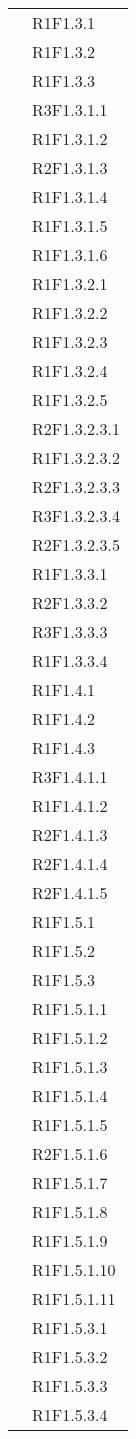 \begin{longtable}{|>{\centering}m{5cm}|m{5cm}<{\centering}|}
&{R1F1.3.1}\\
&{R1F1.3.2}\\
&{R1F1.3.3}\\
&{R3F1.3.1.1}\\
&{R1F1.3.1.2}\\
&{R2F1.3.1.3}\\
&{R1F1.3.1.4}\\
&{R1F1.3.1.5}\\
&{R1F1.3.1.6}\\
&{R1F1.3.2.1}\\
&{R1F1.3.2.2}\\
&{R1F1.3.2.3}\\
&{R1F1.3.2.4}\\
&{R1F1.3.2.5}\\
&{R2F1.3.2.3.1}\\
&{R1F1.3.2.3.2}\\
&{R2F1.3.2.3.3}\\
&{R3F1.3.2.3.4}\\
&{R2F1.3.2.3.5}\\
&{R1F1.3.3.1}\\
&{R2F1.3.3.2}\\
&{R3F1.3.3.3}\\
&{R1F1.3.3.4}\\

&{R1F1.4.1}\\
&{R1F1.4.2}\\
&{R1F1.4.3}\\
&{R3F1.4.1.1}\\
&{R1F1.4.1.2}\\
&{R2F1.4.1.3}\\
&{R2F1.4.1.4}\\
&{R2F1.4.1.5}\\

&{R1F1.5.1}\\
&{R1F1.5.2}\\
&{R1F1.5.3}\\
&{R1F1.5.1.1}\\
&{R1F1.5.1.2}\\
&{R1F1.5.1.3}\\
&{R1F1.5.1.4}\\
&{R1F1.5.1.5}\\
&{R2F1.5.1.6}\\
&{R1F1.5.1.7}\\
&{R1F1.5.1.8}\\
&{R1F1.5.1.9}\\
&{R1F1.5.1.10}\\
&{R1F1.5.1.11}\\
&{R1F1.5.3.1}\\
&{R1F1.5.3.2}\\
&{R1F1.5.3.3}\\
&{R1F1.5.3.4}\\


\end{longtable}
